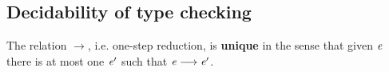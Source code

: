 

\subsection{Decidability of type checking}
\begin{lem}\label{lem:unired}
	The relation $ \longrightarrow $, i.e. one-step reduction, is \textbf{unique} in the sense that given $\mathit{e}$ there is at most one $\mathit{e'}$ such that $\mathit{e}  \longrightarrow  \mathit{e'}$.
\end{lem}

